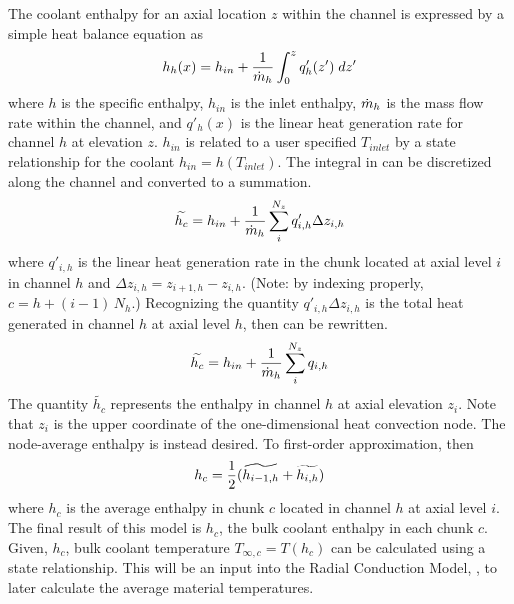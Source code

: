   The coolant enthalpy for an axial location $z$ within the channel is expressed
  by a simple heat balance equation as
  \begin{equation}
    \label{eq:continuous_heat_balance}
    h_h(x) = h_{in} + \frac{1}{\dot{m}_h} \int_0^z q'_h(z') \; dz'
  \end{equation}
  where $h$ is the specific enthalpy, $h_{in}$ is the inlet enthalpy, $\dot{m}_h$
  is the mass flow rate within the channel, and $q'_h(x)$ is the linear heat 
  generation rate for channel $h$ at elevation $z$. $h_{in}$ is related to a
  user specified 
  $T_{inlet}$ by a state relationship for the coolant $h_{in} = h(T_{inlet})$.
  The integral in  can be discretized along the
  channel and converted to a summation.
  \begin{equation}
    \label{eq:heat_balance}
    \widetilde{h_c} = 
      h_{in} + \frac{1}{\dot{m}_h} \sum_{i}^{N_z} q'_{i,h} \Delta z_{i,h}
  \end{equation}
  where $q'_{i,h}$ is the linear heat generation rate in the chunk located at 
  axial level $i$ in 
  channel $h$ and $\Delta z_{i,h} = z_{i+1,h} - z_{i,h}$. (Note: by indexing
  properly, $c = h + (i-1) \, N_h$.) Recognizing the 
  quantity $q'_{i,h} \Delta z_{i,h}$ is the total heat generated in channel $h$ 
  at axial level $h$, then  can be rewritten.
  \begin{equation}
    \widetilde{h_c} = h_{in} + \frac{1}{\dot{m}_h} \sum_i^{N_z} q_{i,h}
  \end{equation}
  The quantity $\widetilde{h_c}$ represents the enthalpy in channel $h$ at axial
  elevation $z_i$. Note that $z_i$ is the upper coordinate of the
  one-dimensional heat convection node. The node-average enthalpy is instead
  desired. To first-order approximation, then
  \begin{equation}
    h_c = \frac{1}{2} (\widetilde{h_{i-1,h}} + \widetilde{h_{i,h}})
  \end{equation}
  where $h_c$ is the average enthalpy in chunk $c$ located in channel $h$ at
  axial level $i$.
  The final result of this model is $h_c$, the bulk coolant enthalpy in each
  chunk $c$. Given, $h_c$, bulk coolant temperature $T_{\infty,c} = T(h_c)$ can
  be calculated using a state relationship. This will be an input into the 
  Radial Conduction Model, , to later 
  calculate the average material temperatures.
  

